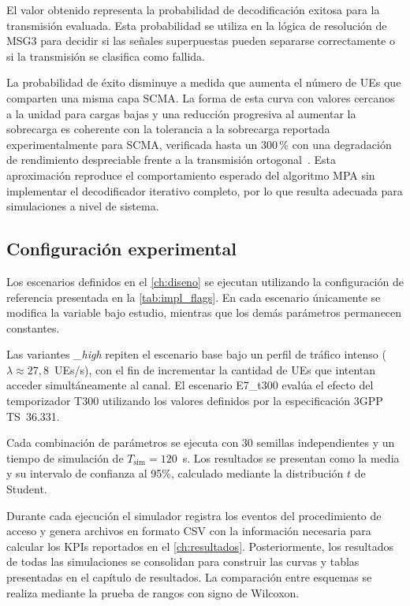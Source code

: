 El valor obtenido representa la probabilidad de decodificación exitosa para la transmisión evaluada. Esta probabilidad se utiliza en la lógica de resolución de MSG3 para decidir si las señales superpuestas pueden separarse correctamente o si la transmisión se clasifica como fallida.

La probabilidad de éxito disminuye a medida que aumenta el número de UEs que comparten una misma capa SCMA. La forma de esta curva con valores cercanos a la unidad para cargas bajas y una reducción progresiva al aumentar la sobrecarga es coherente con la tolerancia a la sobrecarga reportada experimentalmente para SCMA, verificada hasta un $300\,\%$ con una degradación de rendimiento despreciable frente a la transmisión ortogonal~\cite{ref44}. Esta aproximación reproduce el comportamiento esperado del algoritmo MPA sin implementar el decodificador iterativo completo, por lo que resulta adecuada para simulaciones a nivel de sistema.

\subsection{Configuración experimental}
\label{sec:impl_configuracion}

Los escenarios definidos en el \cref{ch:diseno} se ejecutan utilizando la configuración de referencia presentada en la \cref{tab:impl_flags}. En cada escenario únicamente se modifica la variable bajo estudio, mientras que los demás parámetros permanecen constantes.

Las variantes \emph{\_high} repiten el escenario base bajo un perfil de tráfico intenso ($\lambda \approx 27{,}8$~UEs/s), con el fin de incrementar la cantidad de UEs que intentan acceder simultáneamente al canal. El escenario E7\_t300 evalúa el efecto del temporizador T300 utilizando los valores definidos por la especificación 3GPP TS~36.331.

Cada combinación de parámetros se ejecuta con 30 semillas independientes y un tiempo de simulación de $T_{\mathrm{sim}}=120$~s. Los resultados se presentan como la media y su intervalo de confianza al 95\%, calculado mediante la distribución $t$ de Student.

Durante cada ejecución el simulador registra los eventos del procedimiento de acceso y genera archivos en formato CSV con la información necesaria para calcular los KPIs reportados en el \cref{ch:resultados}. Posteriormente, los resultados de todas las simulaciones se consolidan para construir las curvas y tablas presentadas en el capítulo de resultados. La comparación entre esquemas se realiza mediante la prueba de rangos con signo de Wilcoxon.

